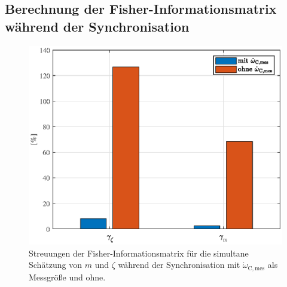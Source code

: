 \subsection{Berechnung der Fisher-Informationsmatrix während der Synchronisation}

\begin{figure}[ht]
  \centering
 \includegraphics[scale=0.9]{figures/03_Sensitivitaetsanalyse/03_Fisher_Info/Sync/m_zeta_Sync.eps}
  \caption{Streuungen der Fisher-Informationsmatrix für die simultane Schätzung von $m$ und $\zeta$ während der Synchronisation mit $\dot{\omega}_\mathrm{C,mes}$ als Messgröße und ohne.}
\end{figure} 